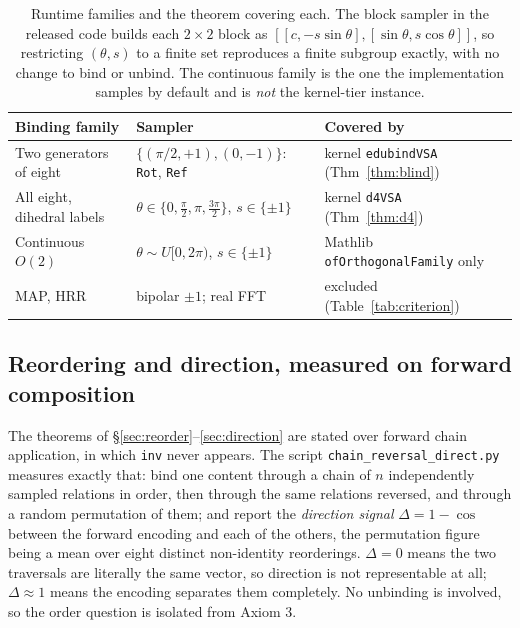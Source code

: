 \documentclass[10pt]{article}
\begin{document}
\begin{table}[h]
\centering
\caption{Runtime families and the theorem covering each. The block sampler in the released code builds each $2\times2$ block as $[[c, -s\sin\theta],[\sin\theta, s\cos\theta]]$, so restricting $(\theta, s)$ to a finite set reproduces a finite subgroup exactly, with no change to bind or unbind. The continuous family is the one the implementation samples by default and is \emph{not} the kernel-tier instance.}
\label{tab:families}
\small
\begin{tabular}{lll}
\toprule
Binding family & Sampler & Covered by \\
\midrule
Two generators of eight    & $\{(\pi/2, +1), (0, -1)\}$: \texttt{Rot}, \texttt{Ref} & kernel \texttt{edubindVSA} (Thm~\ref{thm:blind}) \\
All eight, dihedral labels & $\theta \in \{0, \tfrac{\pi}{2}, \pi, \tfrac{3\pi}{2}\}$, $s \in \{\pm 1\}$ & kernel \texttt{d4VSA} (Thm~\ref{thm:d4}) \\
Continuous $O(2)$          & $\theta \sim U[0, 2\pi)$, $s \in \{\pm 1\}$ & Mathlib \texttt{ofOrthogonalFamily} only \\
MAP, HRR                   & bipolar $\pm 1$; real FFT & excluded (Table~\ref{tab:criterion}) \\
\bottomrule
\end{tabular}
\end{table}


\subsection{Reordering and direction, measured on forward composition}
\label{sec:order-exp}

The theorems of \S\ref{sec:reorder}--\ref{sec:direction} are stated over forward chain application, in which \texttt{inv} never appears. The script \texttt{chain\_\allowbreak reversal\_\allowbreak direct.py} measures exactly that: bind one content through a chain of $n$ independently sampled relations in order, then through the same relations reversed, and through a random permutation of them; and report the \emph{direction signal} $\Delta = 1 - \cos$ between the forward encoding and each of the others, the permutation figure being a mean over eight distinct non-identity reorderings. $\Delta = 0$ means the two traversals are literally the same vector, so direction is not representable at all; $\Delta \approx 1$ means the encoding separates them completely. No unbinding is involved, so the order question is isolated from Axiom 3.
\end{document}
